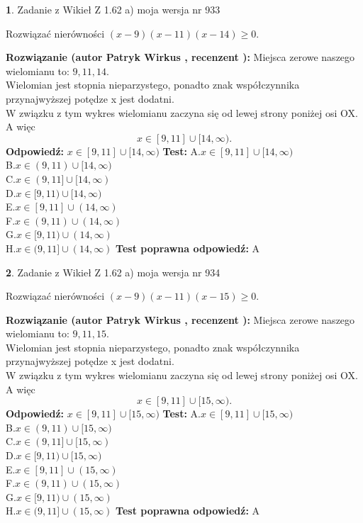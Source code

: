 \documentclass[12pt, a4paper]{article}
\theoremstyle{definition} %
\newtheorem{zad}{}
\newcommand{\zadStart}[1]{\begin{zad}#1\newline}
\newcommand{\zadStop}{\end{zad}}
\newcommand{\rozwStart}[2]{\noindent \textbf{Rozwiązanie (autor #1 , recenzent #2): }\newline}
\newcommand{\rozwStop}{\newline}
\newcommand{\odpStart}{\noindent \textbf{Odpowiedź:}\newline}
\newcommand{\odpStop}{\newline}
\newcommand{\testStart}{\noindent \textbf{Test:}\newline}
\newcommand{\testStop}{\newline}
\newcommand{\kluczStart}{\noindent \textbf{Test poprawna odpowiedź:}\newline}
\newcommand{\kluczStop}{\newline}
\begin{document}
\zadStart{Zadanie z Wikieł Z 1.62 a) moja wersja nr 933}

Rozwiązać nierówności $(x-9)(x-11)(x-14)\ge0$.
\zadStop
\rozwStart{Patryk Wirkus}{}
Miejsca zerowe naszego wielomianu to: $9, 11, 14$.\\
Wielomian jest stopnia nieparzystego, ponadto znak współczynnika przy\linebreak najwyższej potędze x jest dodatni.\\ W związku z tym wykres wielomianu zaczyna się od lewej strony poniżej osi OX. A więc $$x \in [9,11] \cup [14,\infty).$$
\rozwStop
\odpStart
$x \in [9,11] \cup [14,\infty)$
\odpStop
\testStart
A.$x \in [9,11] \cup [14,\infty)$\\
B.$x \in (9,11) \cup [14,\infty)$\\
C.$x \in (9,11] \cup [14,\infty)$\\
D.$x \in [9,11) \cup [14,\infty)$\\
E.$x \in [9,11] \cup (14,\infty)$\\
F.$x \in (9,11) \cup (14,\infty)$\\
G.$x \in [9,11) \cup (14,\infty)$\\
H.$x \in (9,11] \cup (14,\infty)$
\testStop
\kluczStart
A
\kluczStop



\zadStart{Zadanie z Wikieł Z 1.62 a) moja wersja nr 934}

Rozwiązać nierówności $(x-9)(x-11)(x-15)\ge0$.
\zadStop
\rozwStart{Patryk Wirkus}{}
Miejsca zerowe naszego wielomianu to: $9, 11, 15$.\\
Wielomian jest stopnia nieparzystego, ponadto znak współczynnika przy\linebreak najwyższej potędze x jest dodatni.\\ W związku z tym wykres wielomianu zaczyna się od lewej strony poniżej osi OX. A więc $$x \in [9,11] \cup [15,\infty).$$
\rozwStop
\odpStart
$x \in [9,11] \cup [15,\infty)$
\odpStop
\testStart
A.$x \in [9,11] \cup [15,\infty)$\\
B.$x \in (9,11) \cup [15,\infty)$\\
C.$x \in (9,11] \cup [15,\infty)$\\
D.$x \in [9,11) \cup [15,\infty)$\\
E.$x \in [9,11] \cup (15,\infty)$\\
F.$x \in (9,11) \cup (15,\infty)$\\
G.$x \in [9,11) \cup (15,\infty)$\\
H.$x \in (9,11] \cup (15,\infty)$
\testStop
\kluczStart
A
\kluczStop
\end{document}
